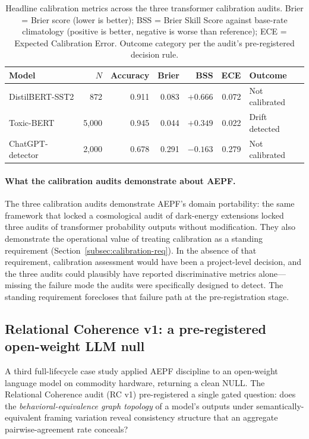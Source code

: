 \documentclass[11pt]{article}
\begin{document}
\begin{table}[h]
\centering
\caption{Headline calibration metrics across the three transformer
calibration audits. Brier = Brier score (lower is better); BSS =
Brier Skill Score against base-rate climatology (positive is better,
negative is worse than reference); ECE = Expected Calibration Error.
Outcome category per the audit's pre-registered decision rule.}
\label{tab:calibration-summary}
\begin{tabular}{lrrrrrl}
\toprule
Model & $N$ & Accuracy & Brier & BSS & ECE & Outcome \\
\midrule
DistilBERT-SST2 & 872 & 0.911 & 0.083 & $+0.666$ & 0.072 & Not calibrated \\
Toxic-BERT & 5{,}000 & 0.945 & 0.044 & $+0.349$ & 0.022 & Drift detected \\
ChatGPT-detector & 2{,}000 & 0.678 & 0.291 & $-0.163$ & 0.279 & Not calibrated \\
\bottomrule
\end{tabular}
\end{table}

\paragraph{What the calibration audits demonstrate about AEPF.}
The three calibration audits demonstrate AEPF's domain portability:
the same framework that locked a cosmological audit of dark-energy
extensions locked three audits of transformer probability outputs
without modification. They also demonstrate the operational value
of treating calibration as a standing requirement
(Section~\ref{subsec:calibration-req}). In the absence of that
requirement, calibration assessment would have been a project-level
decision, and the three audits could plausibly have reported
discriminative metrics alone---missing the failure mode the audits
were specifically designed to detect. The standing requirement
forecloses that failure path at the pre-registration stage.

\subsection{Relational Coherence v1: a pre-registered open-weight LLM null}
\label{subsec:rc-case}

A third full-lifecycle case study applied AEPF discipline to an
open-weight language model on commodity hardware, returning a clean
NULL. The Relational Coherence audit (RC v1)
\cite{dixon2026rcv1} pre-registered a single gated question: does the
\emph{behavioral-equivalence graph topology} of a model's outputs
under semantically-equivalent framing variation reveal consistency
structure that an aggregate pairwise-agreement rate conceals?
\end{document}
